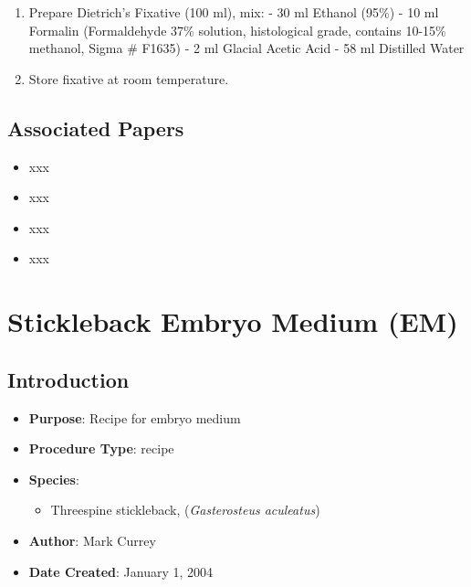 \documentclass[
  letterpaper,
  DIV=11,
  numbers=noendperiod]{scrreprt}
\providecommand{\tightlist}{%
  \setlength{\itemsep}{0pt}\setlength{\parskip}{0pt}}\usepackage{longtable,booktabs,array}
\begin{document}
\begin{enumerate}
\def\labelenumi{\arabic{enumi}.}
\tightlist
\item
  Prepare Dietrich's Fixative (100 ml), mix: - 30 ml Ethanol (95\%) - 10
  ml Formalin (Formaldehyde 37\% solution, histological grade, contains
  10-15\% methanol, Sigma \# F1635) - 2 ml Glacial Acetic Acid - 58 ml
  Distilled Water
\item
  Store fixative at room temperature.
\end{enumerate}

\hypertarget{associated-papers-61}{%
\section{Associated Papers}\label{associated-papers-61}}

\begin{itemize}
\tightlist
\item
  xxx
\item
  xxx
\item
  xxx
\item
  xxx
\end{itemize}

\hypertarget{sec-recipe-em}{%
\chapter{Stickleback Embryo Medium (EM)}\label{sec-recipe-em}}

\hypertarget{introduction-93}{%
\section{Introduction}\label{introduction-93}}

\begin{itemize}
\tightlist
\item
  \textbf{Purpose}: Recipe for embryo medium\\
\item
  \textbf{Procedure Type}: recipe
\item
  \textbf{Species}:

  \begin{itemize}
  \tightlist
  \item
    Threespine stickleback, (\emph{Gasterosteus aculeatus})
  \end{itemize}
\item
  \textbf{Author}: Mark Currey
\item
  \textbf{Date Created}: January 1, 2004
\end{itemize}
\end{document}
